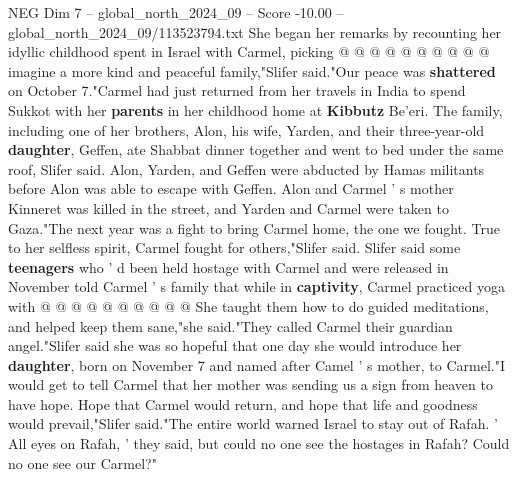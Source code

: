 \begin{textsample}{NEG Dim 7 – global\_north\_2024\_09 – Score -10.00 – global\_north\_2024\_09/113523794.txt}
She began her remarks by recounting her idyllic childhood spent in Israel with Carmel, picking @ @ @ @ @ @ @ @ @ @ imagine a more kind and peaceful family,"Slifer said."Our peace was \textbf{shattered} on October 7."Carmel had just returned from her travels in India to spend Sukkot with her \textbf{parents} in her childhood home at \textbf{Kibbutz} Be'eri.
The family, including one of her brothers, Alon, his wife, Yarden, and their three-year-old \textbf{daughter}, Geffen, ate Shabbat dinner together and went to bed under the same roof, Slifer said.
Alon, Yarden, and Geffen were abducted by Hamas militants before Alon was able to escape with Geffen.
Alon and Carmel ' s mother Kinneret was killed in the street, and Yarden and Carmel were taken to Gaza."The next year was a fight to bring Carmel home, the one we fought.
True to her selfless spirit, Carmel fought for others,"Slifer said.
Slifer said some \textbf{teenagers} who ' d been held hostage with Carmel and were released in November told Carmel ' s family that while in \textbf{captivity}, Carmel practiced yoga with @ @ @ @ @ @ @ @ @ @ She taught them how to do guided meditations, and helped keep them sane,"she said."They called Carmel their guardian angel."Slifer said she was so hopeful that one day she would introduce her \textbf{daughter}, born on November 7 and named after Camel ' s mother, to Carmel."I would get to tell Carmel that her mother was sending us a sign from heaven to have hope.
Hope that Carmel would return, and hope that life and goodness would prevail,"Slifer said."The entire world warned Israel to stay out of Rafah. ' All eyes on Rafah, ' they said, but could no one see the hostages in Rafah?
Could no one see our Carmel?"

\end{textsample}
